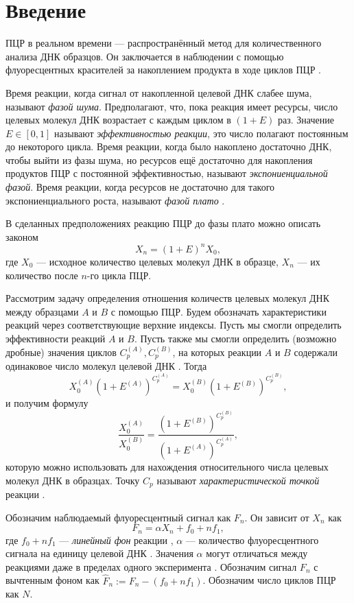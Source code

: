 
\section{Введение}

ПЦР в реальном времени --- распространённый метод для количественного анализа
ДНК образцов. Он заключается в наблюдении с помощью флуоресцентных красителей
за накоплением продукта в ходе циклов ПЦР
\cite{kubistaRealtimePolymeraseChain2006}.

Время реакции, когда сигнал от накопленной целевой ДНК слабее шума, называют
{\it фазой шума}. Предполагают, что, пока реакция имеет ресурсы, число
целевых молекул ДНК возрастает с каждым циклом в $(1+E)$ раз. Значение
$E\in[0,1]$ называют {\it эффективностью реакции}, это число полагают
постоянным до некоторого цикла. Время реакции, когда было накоплено достаточно
ДНК, чтобы выйти из фазы шума, но ресурсов ещё достаточно для накопления
продуктов ПЦР с постоянной эффективностью, называют {\it экспониенциальной
фазой}. Время реакции, когда ресурсов не достаточно для такого
экспониенциального роста, называют {\it фазой плато}
\cite{rebrikovRealtimePCRReview2006}.

В сделанных предположениях реакцию ПЦР до фазы плато можно описать законом
\[
  X_{n}=(1+E)^{n}X_0,
\]
где $X_0$ --- исходное количество целевых молекул ДНК в образце, $X_{n}$ ---
их количество после $n$-го цикла ПЦР.

Рассмотрим задачу определения отношения количеств целевых молекул ДНК между
образцами $A$ и $B$ с помощью ПЦР. Будем обозначать характеристики реакций
через соответствующие верхние индексы. Пусть мы смогли определить эффективности
реакций $A$ и $B$. Пусть также мы смогли определить (возможно дробные)
значения циклов $C_{p}^{(A)}, C_{p}^{(B)}$, на которых реакции $A$ и $B$
содержали одинаковое число молекул целевой ДНК
\cite{rasmussenQuantificationLightCycler2001}. Тогда
\[
  X_0^{(A)}(1+E^{(A)})^{C_{p}^{(A)}}=
  X_0^{(B)}(1+E^{(B)})^{C_{p}^{(B)}},
\]
и получим формулу
\[
  \frac{X_0^{(A)}}{X_0^{(B)}}=
  \frac{(1+E^{(B)})^{C_{p}^{(B)}}}{(1+E^{(A)})^{C_{p}^{(A)}}},
\]
которую можно использовать для нахождения относительного числа целевых молекул
ДНК в образцах. Точку $C_{p}$ называют {\it характеристической точкой} реакции
\cite{rebrikovPCRRealnomVremeni2009}.

Обозначим наблюдаемый флуоресцентный сигнал как $F_{n}$. Он зависит
от $X_{n}$ как
\begin{equation}\label{eq:signal}
  F_{n}=\alpha X_{n} + f_0+nf_1,
\end{equation}
где $f_0+nf_1$ --- {\it линейный фон} реакции
\cite{peccoudStatisticalEstimationsPCR1998}, $\alpha$ --- количество
флуоресцентного сигнала на единицу целевой ДНК
\cite{rebrikovRealtimePCRReview2006}. Значения $\alpha$ могут отличаться между
реакциями даже в пределах одного эксперимента
\cite{rebrikovRealtimePCRReview2006,larionovStandardCurveBased2005}. Обозначим
сигнал $F_{n}$ с вычтенным фоном как $\hat F_{n}:=F_{n}-(f_0+nf_1)$. Обозначим
число циклов ПЦР как $N$.


